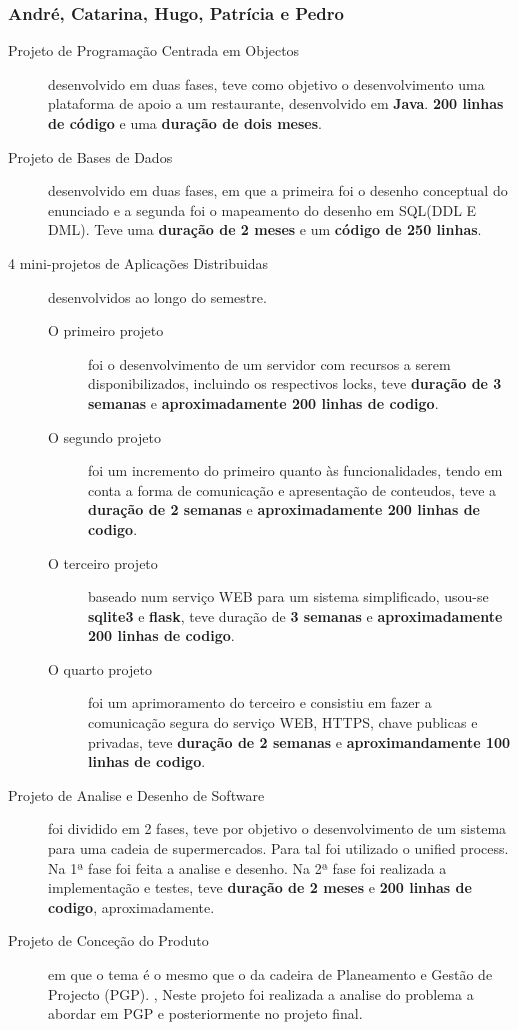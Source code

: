 \documentclass[a4paper]{report}
\begin{document}
\subsubsection*{André, Catarina, Hugo, Patrícia e Pedro} 
\begin{description}
    \item[Projeto de Programação Centrada em Objectos] desenvolvido em duas fases, teve como objetivo o desenvolvimento uma plataforma de apoio a um restaurante, desenvolvido em \textbf{Java}. \textbf{200 linhas de código} e uma \textbf{duração de dois meses}.
    
    \item[Projeto de Bases de Dados] desenvolvido em duas fases, em que a primeira foi o desenho conceptual do enunciado e a segunda foi o mapeamento do desenho em SQL(DDL E DML). Teve uma \textbf{duração de 2 meses} e um \textbf{código de 250 linhas}.
    \item[4 mini-projetos de Aplicações Distribuidas] desenvolvidos ao longo do semestre.
    \begin{description}
    	\item[O primeiro projeto] foi o desenvolvimento de um servidor com recursos a serem disponibilizados, incluindo os respectivos locks, teve  \textbf{duração de 3 semanas} e \textbf{aproximadamente 200 linhas de codigo}.
    	\item[O segundo projeto] foi um incremento do primeiro quanto às funcionalidades, tendo em conta a forma de comunicação e apresentação de conteudos, teve a \textbf{duração de 2 semanas} e \textbf{aproximadamente 200 linhas de codigo}.
    	\item[O terceiro projeto] baseado num serviço WEB para um sistema simplificado, usou-se \textbf{sqlite3} e \textbf{flask}, teve duração de \textbf{3 semanas} e \textbf{aproximadamente 200 linhas de codigo}.
    	\item[O quarto projeto] foi um aprimoramento do terceiro e consistiu em fazer a comunicação segura do serviço WEB, HTTPS, chave publicas e privadas, teve \textbf{duração de 2 semanas} e \textbf{aproximandamente 100 linhas de codigo}.
    \end{description}
    \item[Projeto de Analise e Desenho de Software] foi dividido em 2 fases, teve por objetivo o desenvolvimento de um sistema para uma cadeia de supermercados. Para tal foi utilizado o unified process. Na 1ª fase foi feita a analise e desenho. Na 2ª fase foi realizada a  implementação e testes, teve \textbf{duração de 2 meses} e \textbf{200 linhas de codigo}, aproximadamente.
    
    \item[Projeto de Conceção do Produto] em que o tema é o mesmo que o da cadeira de Planeamento e Gestão de Projecto (PGP). , Neste projeto foi realizada a analise do problema a abordar em PGP e posteriormente no projeto final.
\end{description}
\end{document}

